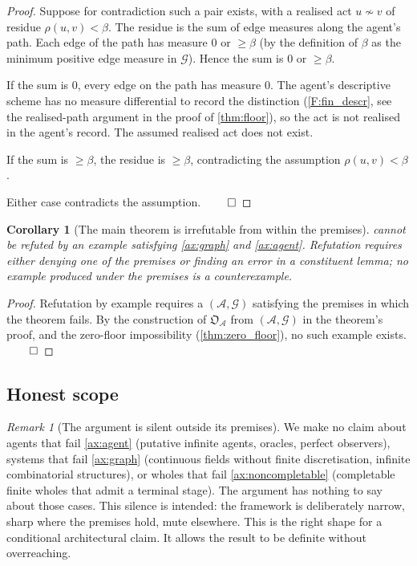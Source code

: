 \documentclass[11pt,a4paper]{article}
\theoremstyle{thmstyle}
\newtheorem{corollary}[theorem]{Corollary}
\theoremstyle{definition}
\theoremstyle{remark}
\newtheorem{remark}[theorem]{Remark}
\newcommand{\Graph}{\mathcal{G}}
\newcommand{\Agent}{\mathcal{A}}
\newcommand{\Res}{\rho}
\newcommand{\floor}{\beta}
\newcommand{\OpStr}{\mathfrak{O}}
\begin{document}
\begin{proof}
Suppose for contradiction such a pair exists, with a realised act
$u \not\sim v$ of residue $\Res(u, v) < \floor$. The residue is the
sum of edge measures along the agent's path. Each edge of the path
has measure $0$ or $\geq \floor$ (by the definition of $\floor$ as
the minimum positive edge measure in $\Graph$). Hence the sum is
$0$ or $\geq \floor$.

If the sum is $0$, every edge on the path has measure $0$. The
agent's descriptive scheme has no measure differential to record
the distinction (\cref{F:fin_descr}, see the realised-path argument
in the proof of \cref{thm:floor}), so the act is not realised in
the agent's record. The assumed realised act does not exist.

If the sum is $\geq \floor$, the residue is $\geq \floor$,
contradicting the assumption $\Res(u, v) < \floor$.

Either case contradicts the assumption. $\qed$
\end{proof}

\begin{corollary}[The main theorem is irrefutable from within the
premises]
\label{cor:irrefutable}
 cannot be refuted by an example satisfying
\cref{ax:graph} and \cref{ax:agent}. Refutation requires either
denying one of the premises or finding an error in a constituent
lemma; no example produced under the premises is a counterexample.
\end{corollary}

\begin{proof}
Refutation by example requires a $(\Agent, \Graph)$ satisfying the
premises in which the theorem fails. By the construction of
$\OpStr_\Agent$ from $(\Agent, \Graph)$ in the theorem's proof, and
the zero-floor impossibility (\cref{thm:zero_floor}), no such
example exists. $\qed$
\end{proof}

\subsection{Honest scope}

\begin{remark}[The argument is silent outside its premises]
\label{rem:silent}
We make no claim about agents that fail \cref{ax:agent} (putative
infinite agents, oracles, perfect observers), systems that fail
\cref{ax:graph} (continuous fields without finite discretisation,
infinite combinatorial structures), or wholes that fail
\cref{ax:noncompletable} (completable finite wholes that admit a
terminal stage). The argument has nothing to say about those cases.
This silence is intended: the framework is deliberately narrow,
sharp where the premises hold, mute elsewhere. This is the right
shape for a conditional architectural claim. It allows the result
to be definite without overreaching.
\end{remark}
\end{document}
